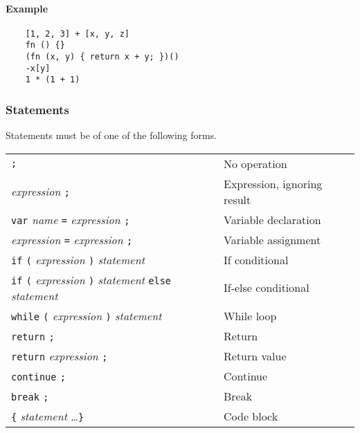 \documentclass[12pt, a4paper]{article}
\begin{document}
\paragraph{Example}

\begin{verbatim}
    [1, 2, 3] + [x, y, z]
    fn () {}
    (fn (x, y) { return x + y; })()
    -x[y]
    1 * (1 + 1)
\end{verbatim}

\subsubsection{Statements}

Statements must be of one of the following forms.

\begin{table}[H]
    \begin{tabular}{ l l }
        \verb|;|                                                                                          & No operation                \\
        \textit{expression} \verb|;|                                                                      & Expression, ignoring result \\
        \verb|var| \textit{name} \verb|=| \textit{expression} \verb|;|                                    & Variable declaration        \\
        \textit{expression} \verb|=| \textit{expression} \verb|;|                                         & Variable assignment         \\
        \verb|if| \verb|(| \textit{expression} \verb|)| \textit{statement}                                & If conditional              \\
        \verb|if| \verb|(| \textit{expression} \verb|)| \textit{statement} \verb|else| \textit{statement} & If-else conditional         \\
        \verb|while| \verb|(| \textit{expression} \verb|)| \textit{statement}                             & While loop                  \\
        \verb|return| \verb|;|                                                                            & Return                      \\
        \verb|return| \textit{expression} \verb|;|                                                        & Return value                \\
        \verb|continue| \verb|;|                                                                          & Continue                    \\
        \verb|break| \verb|;|                                                                             & Break                       \\
        \verb|{| \textit{statement} \ldots \verb|}|                                                       & Code block                  \\
    \end{tabular}
\end{table}
\end{document}
